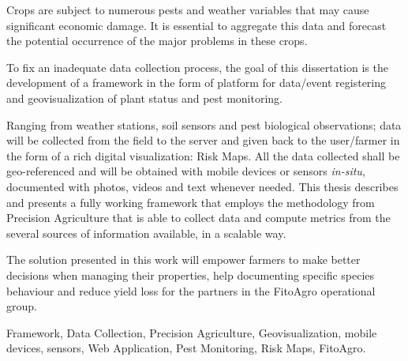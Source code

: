 Crops are subject to numerous pests and weather variables that may cause significant economic damage. It is essential to aggregate this data and forecast the potential occurrence of the major problems in these crops. 

To fix an inadequate data collection process, the goal of this dissertation is the development of a framework in the form of platform for data/event registering and geovisualization of plant status and pest monitoring.

Ranging from weather stations, soil sensors and pest biological observations; data will be collected from the field to the server and given back to the user/farmer in the form of a rich digital visualization: Risk Maps. All the data collected shall be geo-referenced and will be obtained with mobile devices or sensors \emph{in-situ}, documented with photos, videos and text whenever needed.
This thesis describes and presents a fully working framework that employs the methodology from Precision Agriculture that is able to collect data and compute metrics from the several sources of information available, in a scalable way.

The solution presented in this work will empower farmers to make better decisions when managing their properties, help documenting specific species behaviour and reduce yield loss for the partners in the FitoAgro operational group.

\begin{keywords}
Framework, Data Collection, Precision Agriculture, Geovisualization, mobile devices, sensors, Web Application, Pest Monitoring, Risk Maps, FitoAgro.
\end{keywords} 
